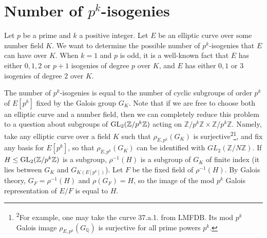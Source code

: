 \documentclass[10pt,leqno]{amsart}
\newcommand{\Z}{\mathbb{Z}}
\newcommand{\Q}{\mathbb{Q}}
\newcommand{\GL}{\textnormal{GL}}
\theoremstyle{definition}
\theoremstyle{remark}
\numberwithin{theorem}{section}
\begin{document}

    










\section{Number of $p^k$-isogenies}\label{sec3}

Let $p$ be a prime and $k$ a positive integer. Let $E$ be an elliptic curve over some number field $K$. We want to determine the possible number of $p^k$-isogenies that $E$ can have over $K$. When $k=1$ and $p$ is odd, it is a well-known fact that $E$ has either $0,1, 2$ or $p+1$  isogenies of degree $p$ over $K$, and $E$ has either $0,1$ or $3$ isogenies of degree $2$ over $K$.


The number of $p^k$-isogenies is equal to the number of cyclic subgroups of order $p^k$ of $E[p^k]$ fixed by the Galois group $G_K$. Note that if we are free to choose both an elliptic curve and a number field, then we can completely reduce this problem to a question about subgroups of $\GL_2(\Z/p^k\Z)$ acting on $\Z/p^k\Z \times \Z/p^k\Z$. Namely, take any elliptic curve over a field $K$ such that $\rho_{E, p^k}(G_K)$ is surjective\textsuperscript{2}\footnote{\textsuperscript{2}For example, one may take the curve 37.a.1. from LMFDB. Its mod $p^k$ Galois image $\rho_{E,p^k}(G_\Q)$ is surjective for all prime powers $p^k$.}, and fix any basis for $E[p^k]$, so that $\rho_{E,p^k}(G_K)$ can be identified with $GL_2(\Z/N\Z)$.   If $H \leq \GL_2(\Z/p^k\Z)$ is a subgroup, $\rho^{-1}(H)$ is a subgroup of $G_K$ of finite index (it lies between $G_K$ and $G_{K(E[p^k])}$). Let $F$ be the fixed field of $\rho^{-1}(H)$. By Galois theory, $G_F=\rho^{-1}(H)$ and $\rho(G_F)=H$, so the image of the mod $p^k$ Galois representation of $E/F$ is equal to $H$.
\end{document}
